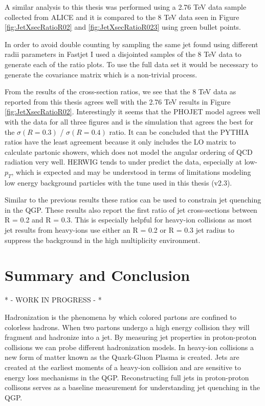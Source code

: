 A similar analysis to this thesis was performed using a 2.76 TeV  data sample collected from ALICE\cite{MA2013319} and it is compared to the 8 TeV data seen in Figure \ref{fig:JetXsecRatioR02} and \ref{fig:JetXsecRatioR023} using green bullet points.  

In order to avoid double counting by sampling the same jet found using different radii parameters in Fastjet I used a disjointed samples of the 8 TeV data to generate each of the ratio plots.  To use the full data set it would be necessary to generate the covariance matrix which is a non-trivial process.   

From the results of the cross-section ratios, we see that the 8 TeV data as reported from this thesis agrees well with the 2.76 TeV results in Figure \ref{fig:JetXsecRatioR02}.  Interestingly it seems that the PHOJET model agrees well with the data for all three figures and is the simulation that agrees the best for the $\sigma (R = 0.3)$ / $\sigma (R = 0.4)$ ratio.  It can be concluded that the PYTHIA ratios have the least agreement because it only includes the LO matrix to calculate partonic showers, which does not model the angular ordering of QCD radiation very well.  HERWIG tends to under predict the data, especially at low-$p_{T}$, which is expected and may be understood in terms of limitations modeling low energy background particles with the tune used in this thesis (v2.3).  

Similar to the previous results these ratios can be used to constrain jet quenching in the QGP.  These results also report the first ratio of jet cross-sections between R = 0.2 and R = 0.3.  This is especially helpful for heavy-ion collisions as most jet results from heavy-ions use either an R = 0.2 or R = 0.3 jet radius to suppress the background in the high multiplicity environment.


\section{Summary and Conclusion}

* - WORK IN PROGRESS - *

Hadronization is the phenomena by which colored partons are confined to colorless hadrons.  When two partons undergo a high energy collision they will fragment and hadronize into a jet.  By measuring jet properties in proton-proton collisions we can probe different hadronization models.  In heavy-ion collisions a new form of matter known as the Quark-Gluon Plasma is created.  Jets are created at the earliest moments of a heavy-ion collision and are sensitive to energy loss mechanisms in the QGP.  Reconstructing full jets in proton-proton collisons serves as a baseline measurement for understanding jet quenching in the QGP. 

